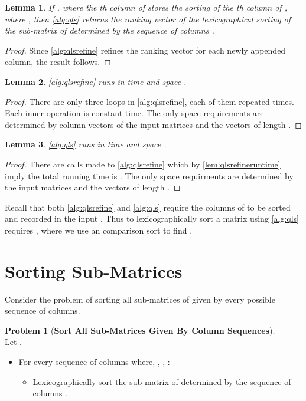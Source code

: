\documentclass[a4paper,10pt,reqno]{amsart}
\newtheorem{lemma}{Lemma}
\theoremstyle{definition}
\newtheorem{problem}{Problem}
\begin{document}
\begin{lemma} 
\label{lem:qls}
If ,  where the th column of
 stores the sorting of the th column of
,  where  , then
\autoref{alg:qls} returns the ranking vector  of the lexicographical
sorting  of the sub-matrix of  determined by the sequence of columns
.
\end{lemma}
\begin{proof}
Since \autoref{alg:qlsrefine} refines the ranking vector for each newly
appended column, the result follows.
\end{proof}

\begin{lemma} 
\autoref{alg:qlsrefine} runs in time  and space .
\label{lem:qlsrefineruntime}
\end{lemma}
\begin{proof}
There are only three loops in \autoref{alg:qlsrefine}, each of them
repeated  times. Each inner operation is constant time.  The only space
requirements are determined by column vectors of the  input
matrices and the vectors of length .
\end{proof}

\begin{lemma} 
\autoref{alg:qls} runs in time  and space .
\end{lemma}
\begin{proof}
There are  calls made to \autoref{alg:qlsrefine} which by
\autoref{lem:qlsrefineruntime} imply the total running time is .
The only space requirments are determined by the input matrices
and the vectors of length .
\end{proof}

Recall that both \autoref{alg:qlsrefine} and \autoref{alg:qls} require the
columns of  to be sorted and recorded in the input . Thus to
lexicographically sort a matrix  using
\autoref{alg:qls} requires , where we use an
 comparison sort to find .


\section{Sorting Sub-Matrices}
\label{sec:sortingsubmat}

Consider the problem of sorting all sub-matrices of  given by every possible
sequence of columns. 

\begin{problem}[\bf Sort All Sub-Matrices Given By Column Sequences]  \\
Let . 
\begin{itemize}
    \item For every sequence of columns  where, , ,  :
    \begin{itemize}
        \item Lexicographically sort the sub-matrix of  determined by the sequence of columns .
    \end{itemize}
    \label{prob:allseq}
\end{itemize}
\end{problem}
\end{document}
